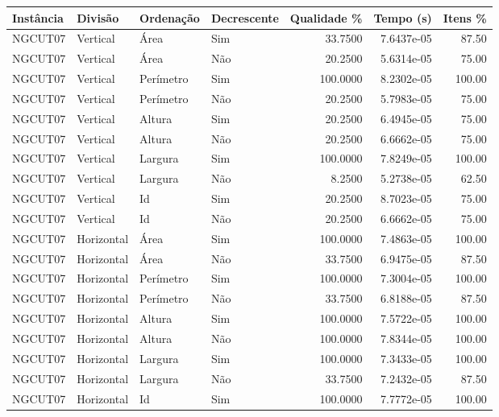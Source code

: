 \begin{tabular}{llllrrr}
\hline
Instância & Divisão     & Ordenação & Decrescente & Qualidade \% & Tempo (s)  & Itens \% \\
\hline
NGCUT07   & Vertical    & Área      & Sim         & 33.7500      & 7.6437e-05 & 87.50    \\
NGCUT07   & Vertical    & Área      & Não         & 20.2500      & 5.6314e-05 & 75.00    \\
NGCUT07   & Vertical    & Perímetro & Sim         & 100.0000     & 8.2302e-05 & 100.00   \\
NGCUT07   & Vertical    & Perímetro & Não         & 20.2500      & 5.7983e-05 & 75.00    \\
NGCUT07   & Vertical    & Altura    & Sim         & 20.2500      & 6.4945e-05 & 75.00    \\
NGCUT07   & Vertical    & Altura    & Não         & 20.2500      & 6.6662e-05 & 75.00    \\
NGCUT07   & Vertical    & Largura   & Sim         & 100.0000     & 7.8249e-05 & 100.00   \\
NGCUT07   & Vertical    & Largura   & Não         & 8.2500       & 5.2738e-05 & 62.50    \\
NGCUT07   & Vertical    & Id        & Sim         & 20.2500      & 8.7023e-05 & 75.00    \\
NGCUT07   & Vertical    & Id        & Não         & 20.2500      & 6.6662e-05 & 75.00    \\
NGCUT07   & Horizontal  & Área      & Sim         & 100.0000     & 7.4863e-05 & 100.00   \\
NGCUT07   & Horizontal  & Área      & Não         & 33.7500      & 6.9475e-05 & 87.50    \\
NGCUT07   & Horizontal  & Perímetro & Sim         & 100.0000     & 7.3004e-05 & 100.00   \\
NGCUT07   & Horizontal  & Perímetro & Não         & 33.7500      & 6.8188e-05 & 87.50    \\
NGCUT07   & Horizontal  & Altura    & Sim         & 100.0000     & 7.5722e-05 & 100.00   \\
NGCUT07   & Horizontal  & Altura    & Não         & 100.0000     & 7.8344e-05 & 100.00   \\
NGCUT07   & Horizontal  & Largura   & Sim         & 100.0000     & 7.3433e-05 & 100.00   \\
NGCUT07   & Horizontal  & Largura   & Não         & 33.7500      & 7.2432e-05 & 87.50    \\
NGCUT07   & Horizontal  & Id        & Sim         & 100.0000     & 7.7772e-05 & 100.00   \\

\end{tabular}
